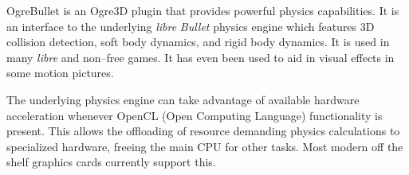 

\startitemize[4]

OgreBullet is an Ogre3D plugin that provides powerful physics capabilities. It is an interface to the underlying {\it libre} {\it Bullet} physics engine which features 3D collision detection, soft body dynamics, and rigid body dynamics. It is used in many {\it libre} and non--free games. It has even been used to aid in visual effects in some motion pictures. 

The underlying physics engine can take advantage of available hardware acceleration whenever OpenCL (Open Computing Language) functionality is present. This allows the offloading of resource demanding physics calculations to specialized hardware, freeing the main CPU for other tasks. Most modern off the shelf graphics cards currently support this.
\stopitemize

